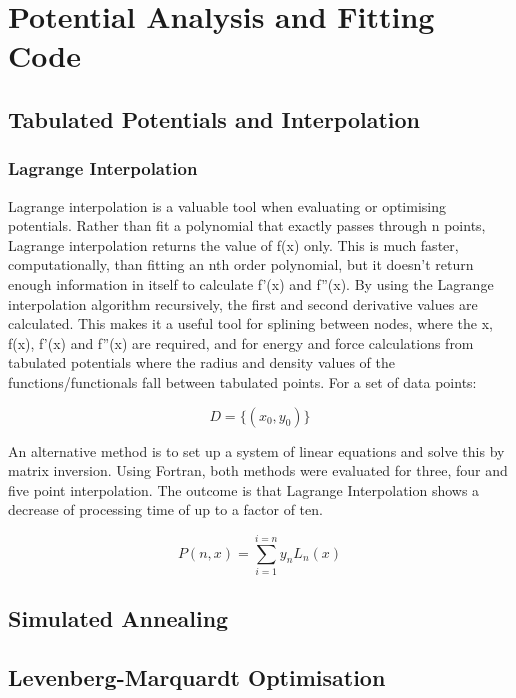 \section{Potential Analysis and Fitting Code}












\subsection{Tabulated Potentials and Interpolation}




\subsubsection{Lagrange Interpolation}

Lagrange interpolation is a valuable tool when evaluating or optimising potentials.  Rather than fit a polynomial that exactly passes through n points, Lagrange interpolation returns the value of f(x) only.  This is much faster, computationally, than fitting an nth order polynomial, but it doesn't return enough information in itself to calculate f'(x) and f''(x).
By using the Lagrange interpolation algorithm recursively, the first and second derivative values are calculated.  This makes it a useful tool for splining between nodes, where the x, f(x), f'(x) and f''(x) are required, and for energy and force calculations from tabulated potentials where the radius and density values of the functions/functionals fall between tabulated points.  For a set of data points:

\begin{equation}
D = \lbrace \left( x_0, y_0 \right) \rbrace
\end{equation}

An alternative method is to set up a system of linear equations and solve this by matrix inversion.  Using Fortran, both methods were evaluated for three, four and five point interpolation.  The outcome is that Lagrange Interpolation shows a decrease of processing time of up to a factor of ten.

\begin{equation}
P(n, x) = \sum_{i=1}^{i=n} y_n L_n (x)
\end{equation}









\subsection{Simulated Annealing}







\subsection{Levenberg-Marquardt Optimisation}









